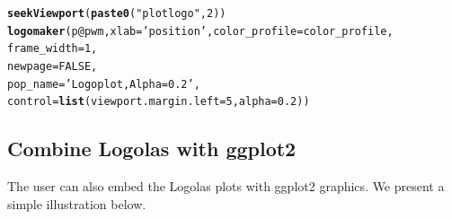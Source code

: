 \documentclass[12pt]{article}\usepackage[]{graphicx}\usepackage[usenames,dvipsnames]{color}
\makeatletter
\newcommand{\hlnum}[1]{\textcolor[rgb]{0.686,0.059,0.569}{#1}}%
\newcommand{\hlstr}[1]{\textcolor[rgb]{0.192,0.494,0.8}{#1}}%
\newcommand{\hlopt}[1]{\textcolor[rgb]{0,0,0}{#1}}%
\newcommand{\hlstd}[1]{\textcolor[rgb]{0.345,0.345,0.345}{#1}}%
\newcommand{\hlkwc}[1]{\textcolor[rgb]{0.333,0.667,0.333}{#1}}%
\newcommand{\hlkwd}[1]{\textcolor[rgb]{0.737,0.353,0.396}{\textbf{#1}}}%
\newenvironment{kframe}{%
 \def\at@end@of@kframe{}%
 \ifinner\ifhmode%
  \def\at@end@of@kframe{\end{minipage}}%
  \begin{minipage}{\columnwidth}%
 \fi\fi%
 \def\FrameCommand##1{\hskip\@totalleftmargin \hskip-\fboxsep
 \colorbox{shadecolor}{##1}\hskip-\fboxsep
     \hskip-\linewidth \hskip-\@totalleftmargin \hskip\columnwidth}%
 \MakeFramed {\advance\hsize-\width
   \@totalleftmargin\z@ \linewidth\hsize
   \@setminipage}}%
 {\par\unskip\endMakeFramed%
 \at@end@of@kframe}
\newenvironment{knitrout}{}{} %
\makeatother
\begin{document}
\begin{knitrout}
\begin{kframe}
\begin{alltt}
\hlkwd{seekViewport}\hlstd{(}\hlkwd{paste0}\hlstd{(}\hlstr{"plotlogo"}\hlstd{,} \hlnum{2}\hlstd{))}
\hlkwd{logomaker}\hlstd{(p}\hlopt{@}\hlkwc{pwm}\hlstd{,}\hlkwc{xlab} \hlstd{=} \hlstr{'position'}\hlstd{,}\hlkwc{color_profile} \hlstd{= color_profile,}
          \hlkwc{frame_width} \hlstd{=} \hlnum{1}\hlstd{,}
          \hlkwc{newpage} \hlstd{=} \hlnum{FALSE}\hlstd{,}
          \hlkwc{pop_name} \hlstd{=} \hlstr{'Logo plot, Alpha=0.2'}\hlstd{,}
          \hlkwc{control} \hlstd{=} \hlkwd{list}\hlstd{(}\hlkwc{viewport.margin.left} \hlstd{=} \hlnum{5}\hlstd{,}\hlkwc{alpha}\hlstd{=}\hlnum{0.2}\hlstd{))}
\end{alltt}
\end{kframe}
\end{knitrout}

\subsection{Combine Logolas with ggplot2}

The user can also embed the Logolas plots with ggplot2 graphics. We present a simple illustration below.
\end{document}
